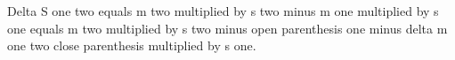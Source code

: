 Delta S one two equals m two multiplied by s two minus m one multiplied by s one equals m two multiplied by s two minus open parenthesis one minus delta m one two close parenthesis multiplied by s one.